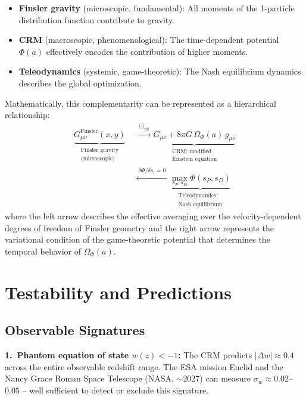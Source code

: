 \documentclass[aps,prd,twocolumn,superscriptaddress,nofootinbib]{revtex4-2}
\begin{document}
\begin{itemize}
\item \textbf{Finsler gravity} (microscopic, fundamental): All moments of the 1-particle distribution function contribute to gravity.
\item \textbf{CRM} (macroscopic, phenomenological): The time-dependent potential $\Phi(a)$ effectively encodes the contribution of higher moments.
\item \textbf{Teleodynamics} (systemic, game-theoretic): The Nash equilibrium dynamics describes the global optimization.
\end{itemize}

Mathematically, this complementarity can be represented as a hierarchical relationship:
\begin{equation}
\begin{split}
\underbrace{G_{\mu\nu}^{\mathrm{Finsler}}(x, y)}_{\substack{\text{Finsler gravity}\\\text{(microscopic)}}}
&\;\xrightarrow{\;\langle\cdot\rangle_{\mathrm{eff}}\;}
\underbrace{G_{\mu\nu} + 8\pi G\,\Omega_\Phi(a)\,g_{\mu\nu}}_{\substack{\text{CRM: modified}\\\text{Einstein equation}}} \\
&\;\xleftarrow{\;\delta\Phi/\delta s_i = 0\;}
\underbrace{\max_{s_P, s_D} \Phi(s_P, s_D)}_{\substack{\text{Teleodynamics:}\\\text{Nash equilibrium}}}
\end{split}
\label{eq:complementarity}
\end{equation}
where the left arrow describes the effective averaging over the velocity-dependent degrees of freedom of Finsler geometry and the right arrow represents the variational condition of the game-theoretic potential that determines the temporal behavior of $\Omega_\Phi(a)$.


\section{Testability and Predictions}
\label{sec:testability}

\subsection{Observable Signatures}

\textbf{1.~Phantom equation of state $w(z) < -1$:} The CRM predicts $|\Delta w| \approx 0.4$ across the entire observable redshift range. The ESA mission Euclid \cite{Euclid2024} and the Nancy Grace Roman Space Telescope (NASA, $\sim$2027) can measure $\sigma_w \approx 0.02$--$0.05$ -- well sufficient to detect or exclude this signature.
\end{document}
